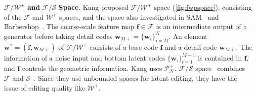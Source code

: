 \documentclass[10pt,twocolumn,letterpaper]{article}
\newcommand{\f}{\bm{f}}
\newcommand{\w}{\bm{w}}
\newcommand{\wmpls}{\bm{w}_{M+}}
\newcommand{\fw}{\bm{w}^{\ast}}
\newcommand{\PPNS}{\mathcal{P}^{+}_{\mathcal{N}}}
\newcommand{\FWS}{\mathcal{F}/\mathcal{W}^{+}}
\newcommand{\WPS}{\mathcal{W}^{+}}
\newcommand{\FSS}{\mathcal{F}/\mathcal{S}}
\newcommand{\SSp}{\mathcal{S}}
\newcommand{\FS}{\mathcal{F}}
\begin{document}
\noindent $\FWS$ \textbf{and} $\FSS$ \textbf{Space}. Kang \etal\cite{Kang_2021_ICCV} proposed $\FWS$ space
(\cref{fig:fwpspace}), consisting of the $\FS$ and $\WPS$ spaces, and the space also investigated in SAM~\cite{parmar2022spatially} and Barbershop~\cite{zhu2021barbershop}. 
The coarse-scale feature map $\f \in \FS$ is an intermediate output of a generator before taking detail codes $\wmpls = \{\w_i\}_{i=M}^{N}$.
An element $\fw = (\f, \wmpls)$ of $\FWS$ consists of a base code $\f$ and a detail code $\wmpls$. 
The information of a noise input and bottom latent codes $\{\w_i\}_{i=1}^{M-1}$ is contained in $\f$, and $\f$ controls the geometric information.
Kang \etal\cite{Kang_2021_ICCV} uses $\PPNS$. 
$\FSS$ space~\cite{yao2022style} combines $\FS$ and $\SSp$~\cite{wu2021stylespace}. 
Since they use unbounded spaces for latent editing, they have the issue of editing quality like $\WPS$.
\end{document}
